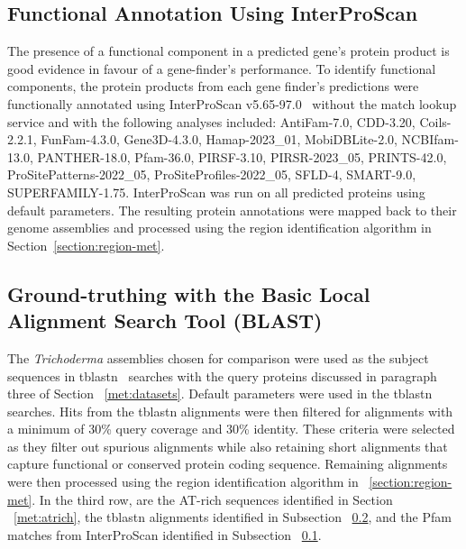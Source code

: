 \subsection{Functional Annotation Using InterProScan}
\label{met:interproscan}
The presence of a functional component in a predicted gene's protein
product is good evidence in favour of a gene-finder's performance. To
identify functional components, the protein products from each gene
finder's predictions were functionally annotated using InterProScan
v5.65-97.0~\cite{jones2014} without the match
lookup service and with the following analyses included: AntiFam-7.0,
CDD-3.20, Coils-2.2.1, FunFam-4.3.0, Gene3D-4.3.0, Hamap-2023\_01,
MobiDBLite-2.0, NCBIfam-13.0, PANTHER-18.0, Pfam-36.0, PIRSF-3.10,
PIRSR-2023\_05, PRINTS-42.0, ProSitePatterns-2022\_05,
ProSiteProfiles-2022\_05, SFLD-4, SMART-9.0,
SUPERFAMILY-1.75. InterProScan was run on all predicted proteins using
default parameters. The resulting protein annotations were mapped back
to their genome assemblies and processed using the region
identification algorithm in Section~\ref{section:region-met}.

\subsection{Ground-truthing with the Basic Local Alignment Search Tool (BLAST)}
\label{met:blast}
The \textit{Trichoderma} assemblies chosen for comparison were used as
the subject sequences in tblastn~\cite{gertz2006} searches with the query proteins discussed in paragraph three of Section ~\ref{met:datasets}. Default parameters were used in the tblastn searches. Hits from the tblastn alignments were then filtered for alignments with a minimum of 30\% query coverage and 30\% identity. These criteria were selected as they filter out spurious alignments while also retaining short alignments that capture functional or conserved protein coding sequence. Remaining alignments were then processed using the region identification algorithm in ~\ref{section:region-met}. In the third row, are the AT-rich sequences identified in Section ~\ref{met:atrich}, the tblastn alignments identified in Subsection ~\ref{met:blast}, and the Pfam matches from InterProScan identified in Subsection ~\ref{met:interproscan}.

